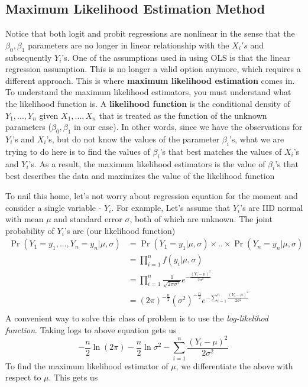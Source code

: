 \documentclass[12pt]{article}
\theoremstyle{definition}
\theoremstyle{property}
\theoremstyle{assumption}
\theoremstyle{example}
\theoremstyle{comment}
\begin{document}
\subsection{Maximum Likelihood Estimation Method}
Notice that both logit and probit regressions are nonlinear in the sense that the $\beta_0, \beta_1$ parameters are no longer in linear relationship with the $X_i's$ and subsequently $Y_i$'s. One of the assumptions used in using OLS is that the linear regression assumption. This is no longer a valid option anymore, which requires a different approach. This is where \textbf{maximum likelihood estimation} comes in. To understand the maximum likelihood estimators, you must understand what the likelihood function is. A \textbf{likelihood function} is the conditional density of $Y_1,...,Y_n$ given $X_1,...,X_n$ that is treated as the function of the unknown parameters ($\beta_0, \beta_1$ in our case). In other words, since we have the observations for $Y_i$'s and $X_i$'s, but do  not know the values of the parameter $\beta_i$'s, what we are trying to do here is to find the values of $\beta_i$'s that best matches the values of $X_i$'s and $Y_i$'s. As a result, the maximum likelihood estimators is the value of $\beta_i$'s that best describes the data and maximizes the value of the likelihood function \par\medskip
To nail this home, let's not worry about regression equation for the moment and consider a single variable - $Y_i$. For example, Let's assume that $Y_i$'s are IID normal with mean $\mu$ and standard error $\sigma$, both of which are unknown. The joint probability of $Y_i$'s are (our likelihood function)
\[
\begin{aligned}
\Pr(Y_1=y_1,...,Y_n=y_n|\mu,\sigma)&=\Pr(Y_1 = y_1|\mu,\sigma)\times..\times\Pr(Y_n=y_n|\mu,\sigma)\\
&=\prod_{i=1}^nf(y_i|\mu,\sigma)\\
&=\prod_{i=1}^n\frac{1}{\sqrt{2\pi\sigma^2}}e^{-\frac{(Y_i-\mu)^2}{2\sigma^2}}\\
&=(2\pi)^{-\frac{n}{2}} (\sigma^2)^{-\frac{n}{2}}e^{-\sum_{i=1}^n\frac{(Y_i-\mu)^2}{2\sigma^2}}\\
\end{aligned}
\]
A convenient way to solve this class of problem is to use the \textit{log-likelihod function}. Taking logs to above equation gets us
\[
-\frac{n}{2}\ln{(2\pi)}-\frac{n}{2}\ln{\sigma^2}-\sum_{i=1}^n\frac{(Y_i-\mu)^2}{2\sigma^2} \ \tag{*}
\]
To find the maximum likelihood estimator of $\mu$, we differentiate the above with respect to $\mu$. This gets us
\end{document}
